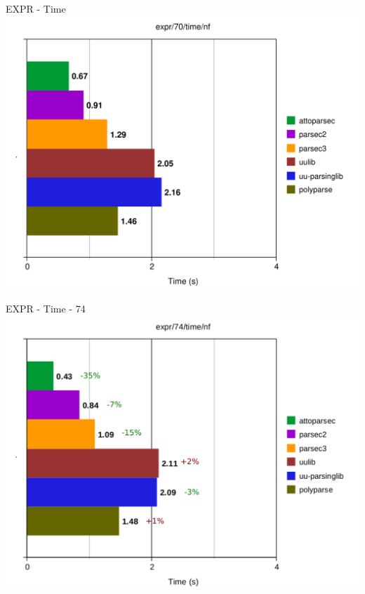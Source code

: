 \documentclass{beamer}
\begin{document}
\begin{frame}{EXPR - Time}
\includegraphics[scale=0.5]{presentation/expr-70-time-nf.pdf}
\end{frame}

\begin{frame}{EXPR - Time - 74}
\includegraphics[scale=0.5]{presentation/expr-74-time-nf_.pdf}
\end{frame}
\end{document}
